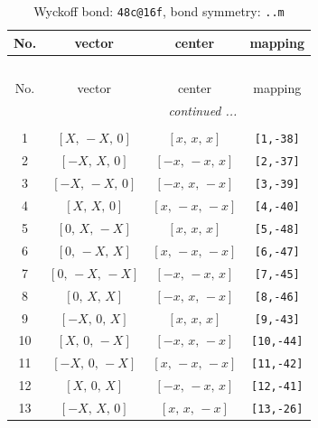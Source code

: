 \documentclass[fleqn,8pt]{jsarticle}
\begin{document}
\begin{longtable}{cccc}
\caption{Wyckoff bond: {\tt 48c@16f}, bond symmetry: {\tt ..m}}
 \\
 \hline \hline
No. & vector & center & mapping \\ \hline \endfirsthead

\multicolumn{3}{l}{\tablename\ \thetable{}} \\
 \hline \hline
No. & vector & center & mapping \\ \hline \endhead

 \hline \hline
\multicolumn{3}{r}{\footnotesize\it continued ...} \\ \endfoot

 \hline \hline
\multicolumn{3}{r}{} \\ \endlastfoot

1 & $\left[ X,\, - X,\, 0 \right]$ & $\left[ x,\, x,\, x \right]$ & {\tt [1,-38]} \\ \hline
2 & $\left[ - X,\, X,\, 0 \right]$ & $\left[ - x,\, - x,\, x \right]$ & {\tt [2,-37]} \\ \hline
3 & $\left[ - X,\, - X,\, 0 \right]$ & $\left[ - x,\, x,\, - x \right]$ & {\tt [3,-39]} \\ \hline
4 & $\left[ X,\, X,\, 0 \right]$ & $\left[ x,\, - x,\, - x \right]$ & {\tt [4,-40]} \\ \hline
5 & $\left[ 0,\, X,\, - X \right]$ & $\left[ x,\, x,\, x \right]$ & {\tt [5,-48]} \\ \hline
6 & $\left[ 0,\, - X,\, X \right]$ & $\left[ x,\, - x,\, - x \right]$ & {\tt [6,-47]} \\ \hline
7 & $\left[ 0,\, - X,\, - X \right]$ & $\left[ - x,\, - x,\, x \right]$ & {\tt [7,-45]} \\ \hline
8 & $\left[ 0,\, X,\, X \right]$ & $\left[ - x,\, x,\, - x \right]$ & {\tt [8,-46]} \\ \hline
9 & $\left[ - X,\, 0,\, X \right]$ & $\left[ x,\, x,\, x \right]$ & {\tt [9,-43]} \\ \hline
10 & $\left[ X,\, 0,\, - X \right]$ & $\left[ - x,\, x,\, - x \right]$ & {\tt [10,-44]} \\ \hline
11 & $\left[ - X,\, 0,\, - X \right]$ & $\left[ x,\, - x,\, - x \right]$ & {\tt [11,-42]} \\ \hline
12 & $\left[ X,\, 0,\, X \right]$ & $\left[ - x,\, - x,\, x \right]$ & {\tt [12,-41]} \\ \hline
13 & $\left[ - X,\, X,\, 0 \right]$ & $\left[ x,\, x,\, - x \right]$ & {\tt [13,-26]} \\ \hline

\end{longtable}
\end{document}
